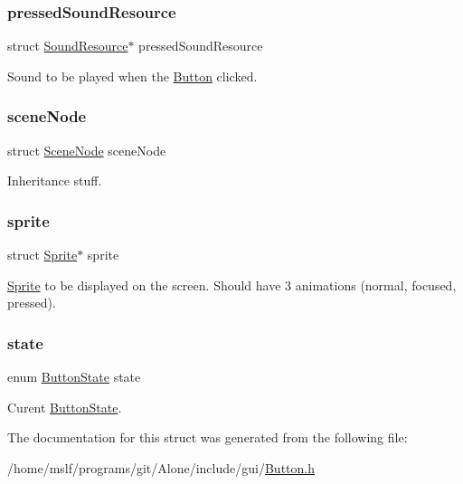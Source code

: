 \subsubsection{\texorpdfstring{pressed\+Sound\+Resource}{pressedSoundResource}}
{\footnotesize\ttfamily struct \hyperlink{struct_sound_resource}{Sound\+Resource}$\ast$ pressed\+Sound\+Resource}

Sound to be played when the \hyperlink{struct_button}{Button} clicked. \hypertarget{struct_button_aca8025f56fb4ce20b974ec9a3292a9e4}{}\label{struct_button_aca8025f56fb4ce20b974ec9a3292a9e4} 
\subsubsection{\texorpdfstring{scene\+Node}{sceneNode}}
{\footnotesize\ttfamily struct \hyperlink{struct_scene_node}{Scene\+Node} scene\+Node}

Inheritance stuff. \hypertarget{struct_button_a1128327f94baacb1570a98fca0591108}{}\label{struct_button_a1128327f94baacb1570a98fca0591108} 
\subsubsection{\texorpdfstring{sprite}{sprite}}
{\footnotesize\ttfamily struct \hyperlink{struct_sprite}{Sprite}$\ast$ sprite}

\hyperlink{struct_sprite}{Sprite} to be displayed on the screen. Should have 3 animations (normal, focused, pressed). \hypertarget{struct_button_a98525fefb11846bc0e1ee154b0a106d4}{}\label{struct_button_a98525fefb11846bc0e1ee154b0a106d4} 
\subsubsection{\texorpdfstring{state}{state}}
{\footnotesize\ttfamily enum \hyperlink{_button_8h_aa46074d34fe2d6631c6bd9dc74633657}{Button\+State} state}

Curent \hyperlink{_button_8h_aa46074d34fe2d6631c6bd9dc74633657}{Button\+State}. 

The documentation for this struct was generated from the following file\+:\begin{DoxyCompactItemize}
\item 
/home/mslf/programs/git/\+Alone/include/gui/\hyperlink{_button_8h}{Button.\+h}\end{DoxyCompactItemize}
